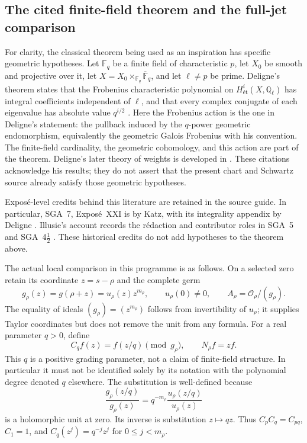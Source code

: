 \subsection{The cited finite-field theorem and the full-jet comparison}
\label{app:deligne-comparison}

For clarity, the classical theorem being used as
an inspiration has specific geometric hypotheses.
Let \(\mathbb F_q\) be a finite field of characteristic
\(p\), let \(X_0\) be smooth and projective over it,
let \(X=X_0\times_{\mathbb F_q}\overline{\mathbb F}_q\),
and let \(\ell\ne p\) be prime. Deligne's theorem
states that the Frobenius characteristic polynomial
on \(H^i_{\text{ét}}(X,\mathbb Q_\ell)\)
has integral coefficients independent of \(\ell\),
and that every complex conjugate of each eigenvalue
has absolute value \(q^{i/2}\)
\cite[theorem (1.6), p.~276]{Deligne1974WeilI}.
Here the Frobenius action is the one in Deligne's
statement: the pullback induced by the \(q\)-power
geometric endomorphism, equivalently the geometric
Galois Frobenius with his convention.
The finite-field cardinality, the geometric
cohomology, and this action are part of the theorem.
Deligne's later theory of weights is developed in
\cite{Deligne1980WeilII}. These citations acknowledge
his results; they do not assert that the present
chart and Schwartz source already satisfy those
geometric hypotheses.

Exposé-level credits behind this literature are retained in the source
guide. In particular, SGA~7, Exposé~XXI is by Katz, with its integrality
appendix by Deligne \citep{Katz1973SGA7XXI,Deligne1973Integrality}.
Illusie's account records the rédaction and contributor roles in SGA~5
and SGA~4\(\tfrac12\) \citep{IllusieChronologySGA5,Deligne1977SGA4Half}.
These historical credits do not add hypotheses to the theorem above.

The actual local comparison in this programme is
as follows. On a selected zero retain its coordinate
\(z=s-\rho\) and the complete germ
\[
g_\rho(z)=g(\rho+z)=u_\rho(z)z^{m_\rho},
\qquad u_\rho(0)\ne0,\qquad
A_\rho=\mathcal O_\rho/(g_\rho).
\]
The equality of ideals
\((g_\rho)=(z^{m_\rho})\) follows from invertibility
of \(u_\rho\); it supplies Taylor coordinates but
does not remove the unit from any formula.
For a real parameter \(q>0\), define
\[
C_qf(z)=f(z/q)\pmod{g_\rho},\qquad N_\rho f=zf.
\]
This \(q\) is a positive grading parameter, not a
claim of finite-field structure. In particular it
must not be identified solely by its notation with
the polynomial degree denoted \(q\) elsewhere.
The substitution is well-defined because
\[
\frac{g_\rho(z/q)}{g_\rho(z)}
=q^{-m_\rho}\frac{u_\rho(z/q)}{u_\rho(z)}
\]
is a holomorphic unit at zero. Its inverse is
substitution \(z\mapsto qz\).
Thus \(C_pC_q=C_{pq}\), \(C_1=1\), and
\(C_q(z^j)=q^{-j}z^j\) for \(0\le j<m_\rho\).

